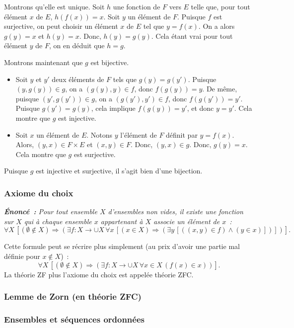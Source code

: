     Montrons qu'elle est unique. 
    Soit $h$ une fonction de $F$ vers $E$ telle que, pour tout élément $x$ de $E$, $h(f(x)) = x$. 
    Soit $y$ un élément de $F$. 
    Puisque $f$ est surjective, on peut choisir un élément $x$ de $E$ tel que $y = f(x)$.
    On a alors $g(y) = x$ et $h(y) = x$. 
    Donc, $h(y) = g(y)$. 
    Cela étant vrai pour tout élément $y$ de $F$, on en déduit que $h = g$.

    Montrons maintenant que $g$ est bijective.
    \begin{itemize}[nosep]
        \item Soit $y$ et $y'$ deux éléments de $F$ tels que $g(y) = g(y')$. 
            Puisque $(y,g(y)) \in g$, on a $(g(y),y) \in f$, donc $f(g(y)) = y$.
            De même, puisque $(y',g(y')) \in g$, on a $(g(y'),y') \in f$, donc $f(g(y')) = y'$.
            Puisque $g(y') = g(y)$, cela implique $f(g(y)) = y'$, et donc $y = y'$.
            Cela montre que $g$ est injective.
        \item Soit $x$ un élément de $E$. 
            Notons $y$ l'élément de $F$ définit par $y = f(x)$.
            Alors, $(y,x) \in F \times E$ et $(x,y) \in F$. 
            Donc, $(y,x) \in g$.
            Donc, $g(y) = x$.
            Cela montre que $g$ est surjective.
    \end{itemize}
    Puisque $g$ est injective et surjective, il s'agit bien d'une bijection.

   \done 

\subsubsection{Axiome du choix}

\noindent\textit{\textbf{Énoncé :} Pour tout ensemble $X$ d'ensembles non vides, il existe une fonction sur $X$ qui à chaque ensemble $x$ appartenant à $X$ associe un élément de $x$ :}
\begin{equation*}
    \forall X \, \left[ (\emptyset \notin X) \Rightarrow \left( \exists f: X \to \cup X \, \forall x \, [ (x \in X) \Rightarrow ( \exists y \, [((x,y) \in f) \wedge (y \in x)] ) ] \right) \right] .
\end{equation*}

\medskip

\noindent Cette formule peut se récrire plus simplement (au prix d'avoir une partie mal définie pour $x \notin X$) :
\begin{equation*}
    \forall X \, \left[ (\emptyset \notin X) \Rightarrow \left( \exists f: X \to \cup X \, \forall x \in X \, (f(x) \in x) \right) \right] .
\end{equation*}
La théorie ZF plus l'axiome du choix est appelée théorie ZFC.

\subsubsection{Lemme de Zorn (en théorie ZFC)}

\subsubsection{Ensembles et séquences ordonnées}


